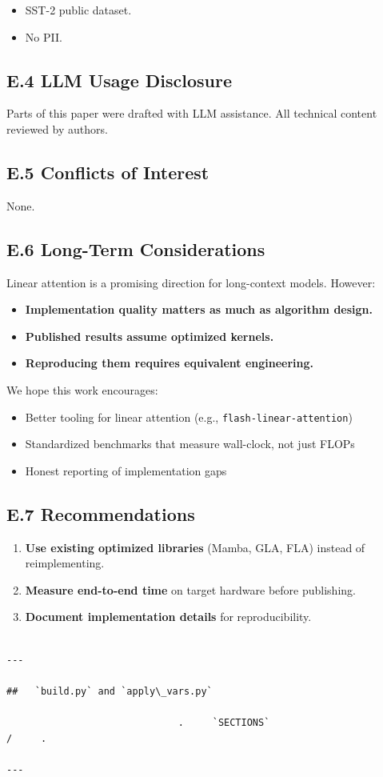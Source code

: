 \begin{itemize}
\item SST-2 public dataset.
\item No PII.

\end{itemize}
\subsection{E.4 LLM Usage Disclosure}

Parts of this paper were drafted with LLM assistance. All technical content 
reviewed by authors.

\subsection{E.5 Conflicts of Interest}

None.

\subsection{E.6 Long-Term Considerations}

Linear attention is a promising direction for long-context models. However:

\begin{itemize}
\item \textbf{Implementation quality matters as much as algorithm design.}
\item \textbf{Published results assume optimized kernels.}
\item \textbf{Reproducing them requires equivalent engineering.}

\end{itemize}
We hope this work encourages:
\begin{itemize}
\item Better tooling for linear attention (e.g., \texttt{flash-linear-attention})
\item Standardized benchmarks that measure wall-clock, not just FLOPs
\item Honest reporting of implementation gaps

\end{itemize}
\subsection{E.7 Recommendations}

\begin{enumerate}
\item \textbf{Use existing optimized libraries} (Mamba, GLA, FLA) instead of
  reimplementing.
\item \textbf{Measure end-to-end time} on target hardware before publishing.
\item \textbf{Document implementation details} for reproducibility.
\end{enumerate}
\begin{lstlisting}

---

##   `build.py` and `apply\_vars.py`

                              .     `SECTIONS`                                 /     .

---
\end{lstlisting}